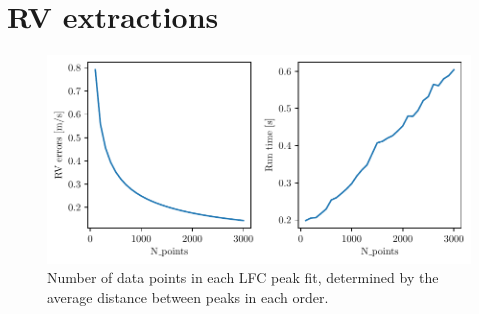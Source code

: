 

% 
% 







% 
% 
\newpage
\section{RV extractions}\label{appendix:RV_extraction}

\begin{figure}%
    \begin{wide}  
    \includegraphics[scale=0.72]{figures/err_vs_run_time.pdf}
    \caption{Number of data points in each LFC peak fit, determined by the average distance between peaks in each order.}
    \label{fig:err_vs_run_time}
\end{wide}
\end{figure}

